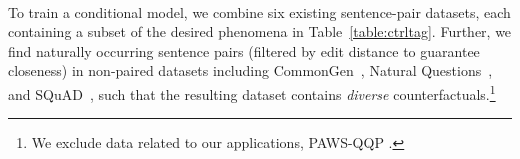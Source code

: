 



\paragraph{}
To train a conditional model, we combine six existing sentence-pair datasets, each containing a subset of the desired phenomena in Table~\ref{table:ctrltag}. 
Further, we find naturally occurring sentence pairs (filtered by edit distance to guarantee closeness) in non-paired datasets including CommonGen~\cite{lin-etal-2020-commongen}, Natural Questions~\cite{kwiatkowski-etal-2019-natural}, and SQuAD~\cite{rajpurkar-etal-2016-squad}, such that the resulting dataset contains \emph{diverse} counterfactuals.\footnote{We exclude data related to our applications, \eg PAWS-QQP \cite{zhang2019paws}. }

